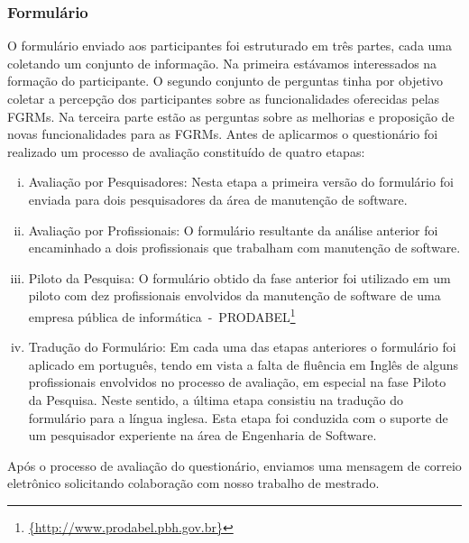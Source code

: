 \subsubsection{Formulário}
\label{subsubsec:questionario}

O formulário enviado aos participantes foi estruturado em três partes, cada uma
coletando um conjunto de informação. Na primeira estávamos interessados na
formação do participante. O segundo conjunto de perguntas tinha por objetivo
coletar a percepção dos participantes sobre as funcionalidades oferecidas pelas
FGRMs\@. Na terceira parte estão as perguntas sobre as melhorias e proposição de
novas funcionalidades para as FGRMs. Antes de aplicarmos o questionário foi
realizado um processo de avaliação constituído de quatro etapas:

\begin{enumerate}[(i)]
	\item Avaliação por Pesquisadores: Nesta etapa a primeira versão do
		formulário foi enviada para dois pesquisadores da área de manutenção de
		software.
	\item Avaliação por Profissionais: O formulário resultante da análise
		anterior foi encaminhado a dois profissionais que trabalham com
		manutenção de software.
	\item Piloto da Pesquisa: O formulário obtido da fase anterior foi utilizado
		em um piloto com dez profissionais envolvidos da manutenção de software
		de uma empresa pública de
		informática~-~PRODABEL\footnote{\url{{http://www.prodabel.pbh.gov.br}}}
	\item Tradução do Formulário: Em cada uma das etapas anteriores o
		formulário foi aplicado em português, tendo em vista a falta de fluência
		em Inglês de alguns profissionais envolvidos no processo de avaliação,
		em especial na fase Piloto da Pesquisa. Neste sentido, a última etapa
		consistiu na tradução do formulário para a língua inglesa. Esta etapa
		foi conduzida com  o suporte de um pesquisador experiente na área de
		Engenharia de Software.
\end{enumerate}

Após o processo de avaliação do questionário, enviamos uma mensagem de correio
eletrônico solicitando colaboração com nosso trabalho de mestrado.


